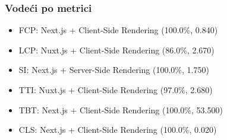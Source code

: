 \subsubsection{Vodeći po metrici}
\begin{itemize}
    \item FCP: Next.js + Client-Side Rendering (100.0\%, 0.840)
    \item LCP: Nuxt.js + Client-Side Rendering (86.0\%, 2.670)
    \item SI: Next.js + Server-Side Rendering (100.0\%, 1.750)
    \item TTI: Nuxt.js + Client-Side Rendering (97.0\%, 2.680)
    \item TBT: Next.js + Client-Side Rendering (100.0\%, 53.500)
    \item CLS: Next.js + Client-Side Rendering (100.0\%, 0.020)
\end{itemize}

